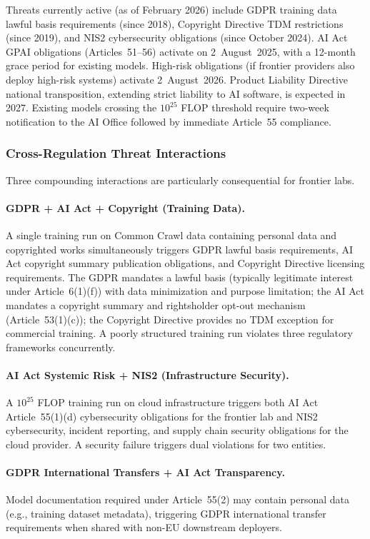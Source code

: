 \documentclass[11pt,a4paper]{article}
\begin{document}
Threats currently active (as of February 2026) include GDPR training data lawful basis requirements (since 2018), Copyright Directive TDM restrictions (since 2019), and NIS2 cybersecurity obligations (since October 2024). AI Act GPAI obligations (Articles~51--56) activate on 2~August~2025, with a 12-month grace period for existing models. High-risk obligations (if frontier providers also deploy high-risk systems) activate 2~August~2026. Product Liability Directive national transposition, extending strict liability to AI software, is expected in 2027. Existing models crossing the $10^{25}$ FLOP threshold require two-week notification to the AI Office followed by immediate Article~55 compliance.

\subsubsection{Cross-Regulation Threat Interactions}

Three compounding interactions are particularly consequential for frontier labs.

\paragraph{GDPR + AI Act + Copyright (Training Data).} A single training run on Common Crawl data containing personal data and copyrighted works simultaneously triggers GDPR lawful basis requirements, AI Act copyright summary publication obligations, and Copyright Directive licensing requirements. The GDPR mandates a lawful basis (typically legitimate interest under Article~6(1)(f)) with data minimization and purpose limitation; the AI Act mandates a copyright summary and rightsholder opt-out mechanism (Article~53(1)(c)); the Copyright Directive provides no TDM exception for commercial training. A poorly structured training run violates three regulatory frameworks concurrently.

\paragraph{AI Act Systemic Risk + NIS2 (Infrastructure Security).} A $10^{25}$ FLOP training run on cloud infrastructure triggers both AI Act Article~55(1)(d) cybersecurity obligations for the frontier lab and NIS2 cybersecurity, incident reporting, and supply chain security obligations for the cloud provider. A security failure triggers dual violations for two entities.

\paragraph{GDPR International Transfers + AI Act Transparency.} Model documentation required under Article~55(2) may contain personal data (e.g., training dataset metadata), triggering GDPR international transfer requirements when shared with non-EU downstream deployers.
\end{document}
